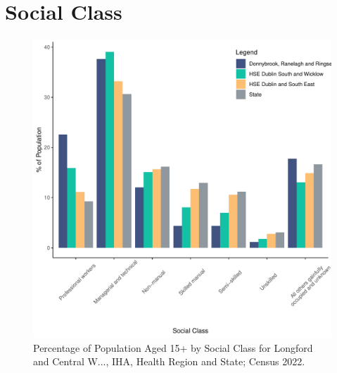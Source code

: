 \documentclass{article}
\begin{document}
\section{Social Class}\label{sect:SC}
\begin{figure}[H]
	\centering
	\includegraphics[width = 140mm]{../figures/SocialClassED.pdf}
	\caption{Percentage of Population Aged 15+ by Social Class for Longford and Central W..., IHA, Health Region and State; Census 2022.}
	\label{fig:vbnv}
	\end{figure}
\end{document}
